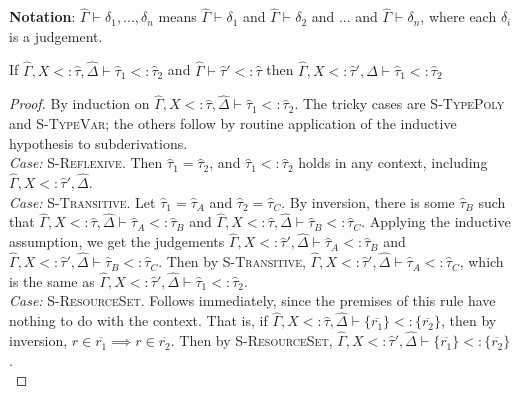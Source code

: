\documentclass{llncs}
\begin{document}
\noindent
\textbf{Notation}: $\hat \Gamma \vdash \delta_1, ..., \delta_n$ means $\hat \Gamma \vdash \delta_1$ and $\hat \Gamma \vdash \delta_2$ and ... and $\hat \Gamma \vdash \delta_n$, where each $\delta_i$ is a judgement.

\hrulefill

\begin{lemma}
If $\hat \Gamma, X <: \hat \tau, \hat \Delta \vdash \hat \tau_1 <: \hat \tau_2$ and $\hat \Gamma \vdash \hat \tau' <: \hat \tau$ then $\hat \Gamma, X <: \hat \tau', \hat \Delta \vdash \hat \tau_1 <: \hat \tau_2$
\end{lemma}

\begin{proof}

By induction on $\hat \Gamma, X<: \hat \tau, \hat \Delta \vdash \hat \tau_1 <: \hat \tau_2$. The tricky cases are \textsc{S-TypePoly} and \textsc{S-TypeVar}; the others follow by routine application of the inductive hypothesis to subderivations.\\

\textit{Case:} \textsc{S-Reflexive}. Then $\hat \tau_1 = \hat \tau_2$, and $\hat \tau_1 <: \hat \tau_2$ holds in any context, including $\hat \Gamma, X <: \hat \tau', \hat \Delta$.\\

\textit{Case:} \textsc{S-Transitive}. Let $\hat \tau_1 = \hat \tau_A$ and $\hat \tau_2 = \hat \tau_C$. By inversion, there is some $\hat \tau_B$ such that $\hat \Gamma, X <: \hat \tau, \hat \Delta \vdash \hat \tau_A <: \hat \tau_B$ and $\hat \Gamma, X <: \hat \tau, \hat \Delta \vdash \hat \tau_B <: \hat \tau_C$. Applying the inductive assumption, we get the judgements $\hat \Gamma, X <: \hat \tau', \hat \Delta \vdash \hat \tau_A <: \hat \tau_B$ and $\hat \Gamma, X <: \hat \tau', \hat \Delta \vdash \hat \tau_B <: \hat \tau_C$. Then by \textsc{S-Transitive}, $\hat \Gamma, X <: \hat \tau', \hat \Delta \vdash \hat \tau_A <: \hat \tau_C$, which is the same as $\hat \Gamma, X <: \hat \tau', \hat \Delta \vdash \hat \tau_1 <: \hat \tau_2$.\\

\textit{Case:} \textsc{S-ResourceSet}. Follows immediately, since the premises of this rule have nothing to do with the context. That is, if $\hat \Gamma, X <: \hat \tau, \hat \Delta \vdash \{ \overline{r_1} \} <: \{ \overline{r_2} \}$, then by inversion, $r \in \overline{r_1} \implies r \in \overline{r_2}$. Then by \textsc{S-ResourceSet}, $\hat \Gamma, X <: \hat \tau', \hat \Delta \vdash \{ \overline{r_1} \} <: \{ \overline{r_2} \}$.\\


\end{proof}
\end{document}
